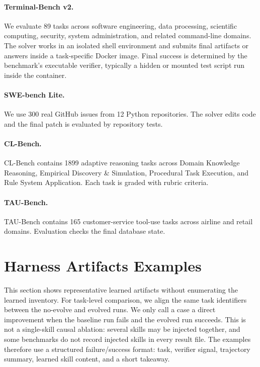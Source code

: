 \paragraph{Terminal-Bench v2.}
We evaluate 89 tasks across software engineering, data processing, scientific
computing, security, system administration, and related command-line domains.
The solver works in an isolated shell environment and submits final artifacts or
answers inside a task-specific Docker image. Final success is determined by the
benchmark's executable verifier, typically a hidden or mounted test script run
inside the container. 

\paragraph{SWE-bench Lite.}
We use 300 real GitHub issues from 12 Python repositories. The solver edits code
and the final patch is evaluated by repository tests.

\paragraph{CL-Bench.}
CL-Bench contains 1899 adaptive reasoning tasks across Domain Knowledge
Reasoning, Empirical Discovery \& Simulation, Procedural Task Execution, and
Rule System Application. Each task is graded with rubric criteria.

\paragraph{TAU-Bench.}
TAU-Bench contains 165 customer-service tool-use tasks across airline and
retail domains. Evaluation checks the final database state.

\section{Harness Artifacts Examples}\label{app:examples}

This section shows representative learned artifacts without enumerating the
learned inventory. For task-level comparison, we align the same task identifiers
between the no-evolve and evolved runs. We only call a case a direct improvement
when the baseline run fails and the evolved run succeeds. This is not a
single-skill causal ablation: several skills may be injected together, and some
benchmarks do not record injected skills in every result file. The examples
therefore use a structured failure/success format: task, verifier signal,
trajectory summary, learned skill content, and a short takeaway. 

